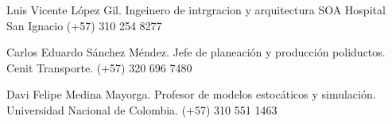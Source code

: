 \documentclass{tccv}
\begin{document}
\begin{eventlist}

\item{Luis Vicente López Gil. }
     { Ingeinero de intrgracion y arquitectura SOA \newline
     Hospital San Ignacio  \newline
     (+57) 310 254 8277}
     { }

\vspace{-6pt}
\item{ Carlos Eduardo Sánchez Méndez. }
     {Jefe de planeación y producción poliductos. \newline Cenit Transporte. \newline
     (+57) 320 696 7480}
     { }
    
\vspace{-6pt} 
\item{Davi Felipe Medina Mayorga. }
     {Profesor de modelos estocáticos y simulación. \newline Universidad Nacional de Colombia. \newline
     (+57) 310 551 1463}
     { }
\end{eventlist}
\end{document}
